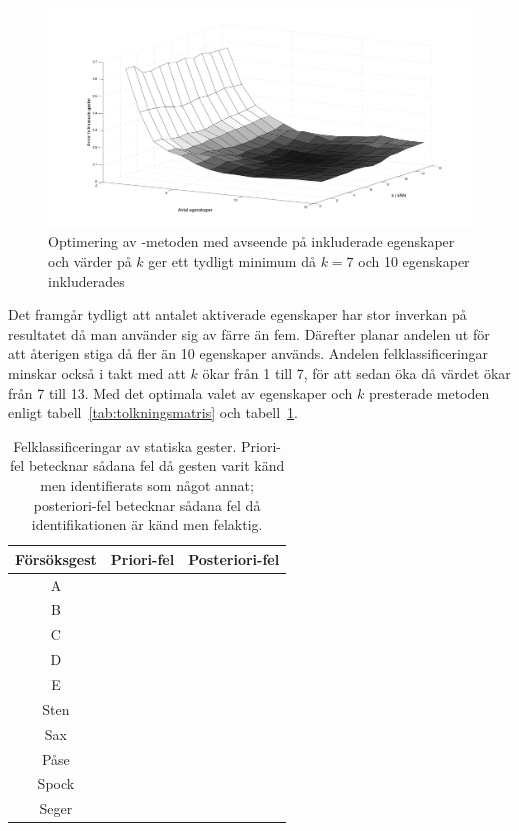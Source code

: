 \documentclass[../rapport_MVEX01-11-05]{subfiles}
\begin{document}
\begin{figure}[tbp]
    \begin{center}
        \includegraphics[trim=2cm 2cm 2cm 1.8cm,width=\columnwidth,clip=true]{bilder/knn_optimering.pdf}
    \end{center}
    \caption{Optimering av \knn-metoden med avseende på inkluderade egenskaper
och värder på $k$ ger ett tydligt minimum då $k=7$ och 10 egenskaper inkluderades}
    \label{fig:knn-optimering}
\end{figure}

Det framgår tydligt att antalet aktiverade egenskaper har stor
inverkan på resultatet då man använder sig av färre än
fem. Därefter planar andelen ut för att återigen stiga då
fler än 10 egenskaper används. Andelen felklassificeringar
minskar också i takt med att $k$ ökar från 1 till 7, för att sedan
öka då värdet ökar från 7 till 13. Med det optimala
valet av egenskaper och $k$ presterade metoden enligt
tabell~\ref{tab:tolkningsmatris} och tabell~\ref{tab:prestanda}.


\begin{table}[tbp]
	\centering
	\caption{Felklassificeringar av statiska gester. Priori-fel
	betecknar sådana fel då gesten varit känd men identifierats
	som något annat; posteriori-fel betecknar sådana fel då
	identifikationen är känd men felaktig. }
	\smallskip
	\label{tab:prestanda}
	\begin{tabular}{c c c}
		\toprule 
		Försöksgest & Priori-fel & Posteriori-fel \\
		\midrule 
		A & & \\
		B & & \\
		C & & \\
		D & & \\
		E & & \\
		Sten & & \\
		Sax & & \\
		Påse & & \\
		Spock & & \\
		Seger & & \\
		\bottomrule 
	\end{tabular}
\end{table}
\end{document}
